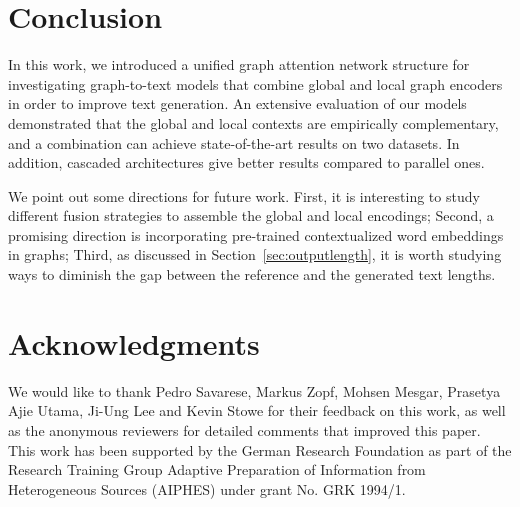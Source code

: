 \documentclass[11pt,a4paper]{article}
\begin{document}
 \section{Conclusion}

In this work, we introduced a unified graph attention network structure for investigating graph-to-text models that combine global and local graph encoders in order to improve text generation. An extensive evaluation of our models demonstrated that the global and local contexts are empirically complementary, and a combination can achieve state-of-the-art results on two datasets. In addition, cascaded architectures give better results compared to parallel ones. 

We point out some directions for future work. First, it is interesting to study different fusion strategies to assemble the global and local encodings; Second, a promising direction is incorporating pre-trained contextualized word embeddings in graphs; Third, as discussed in Section~\ref{sec:outputlength}, it is worth studying ways to diminish the gap between the reference and the generated text lengths. 

\section*{Acknowledgments}
We would like to thank Pedro Savarese, Markus Zopf, Mohsen Mesgar, Prasetya Ajie Utama, Ji-Ung Lee and Kevin Stowe for their feedback on this work, as well as the anonymous reviewers for detailed comments that improved this paper.
This work has been supported by the German Research Foundation as part of the Research Training Group Adaptive Preparation of Information from Heterogeneous Sources (AIPHES) under grant No. GRK 1994/1.  




\end{document}
